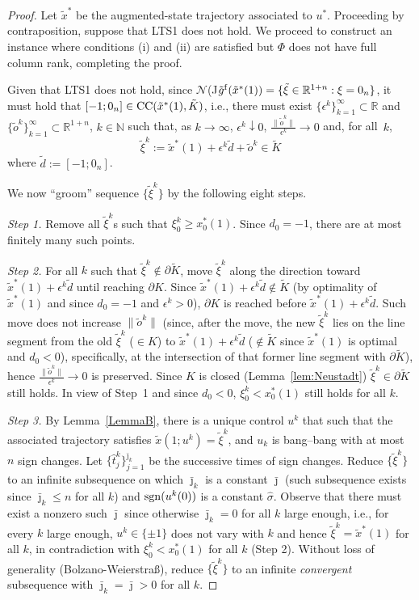 \documentclass[letterpaper,10pt,conference]{ieeeconf}
\def\R{{\mathbb{R}}}
\def\N{{\mathbb{N}}}
\begin{document}
\begin{proof}
Let $\tilde x^*$ be the augmented-state trajectory associated to $u^*$.
Proceeding by contraposition, suppose that LTS1 does not hold. 
We proceed to construct an instance where conditions (i) and (ii) are
satisfied but $\Phi$ does not have full column rank, completing the proof.

Given that LTS1 does not hold, since 
${\mathcal N}$(J$\tilde g^{\rm f}(\tilde x^*(1))
=\{\tilde\xi\in\R^{1+n}:\xi=0_n\}$, 
it must hold that $[-1;0_n]\in{\rm CC}(\tilde x^*(1),\tilde K)$, i.e.,
there must exist $\{\epsilon^k\}_{k=1}^\infty\subset\R$ and 
$\{\tilde o^k\}_{k=1}^\infty\subset\R^{1+n}$, $k\in \N$ such that, 
as $k\to\infty$,
$\epsilon^k\downarrow0$, %
$\frac{\|\tilde o^k\|}{\epsilon^k}\to0$ and, for all~$k$,
\[
\tilde\xi^k:=\tilde x^*(1) + \epsilon^k\tilde d + \tilde o^k\in\tilde K
\]
where 
$\tilde d:=[-1;0_n]$.

We now ``groom'' sequence $\{\tilde\xi^k\}$ by the following eight steps.

\smallskip\noindent
{\em Step 1.}
Remove all $\tilde\xi^k$s such that $\xi_0^k\geq x_0^*(1)$.  Since $d_0=-1$,
there are at most finitely many such points.

\smallskip\noindent
{\em Step 2.}
For all $k$ such that $\tilde\xi^k\not\in\partial\tilde K$, move $\tilde\xi^k$
along the direction toward $\tilde x^*(1)+\epsilon^k\tilde d$ until reaching 
$\partial K$.  Since $\tilde x^*(1)+\epsilon^k\tilde d\not\in\tilde K$ (by 
optimality of $\tilde x^*(1)$ and since $d_0=-1$ and $\epsilon^k>0$), 
$\partial K$ is reached before 
$\tilde x^*(1)+\epsilon^k\tilde d$.  Such move does not increase 
$\|\tilde o^k\|$ (since, after the move, the new $\tilde\xi^k$
lies on the line segment from the old $\tilde\xi^k$ ($\in K$)
to $\tilde x^*(1)+\epsilon^k\tilde d$ ($\not\in\tilde K$ since $\tilde x^*(1)$ 
is optimal and $d_0<0$), specifically, at the intersection
of that former line segment with $\partial\tilde K$), hence 
$\frac{\|\tilde o^k\|}{\epsilon^k}\to0$ is preserved.  
Since $K$ is closed (Lemma~\ref{lem:Neustadt}) 
$\tilde\xi^k\in\partial\tilde K$ still holds.  
In view of Step~1 and since $d_0<0$, $\xi_0^k<x_0^*(1)$ still holds for all $k$.

\smallskip\noindent
{\em Step 3.}
By Lemma~\ref{LemmaB}, there is a unique 
control $u^k$ that such that the associated
trajectory satisfies $\tilde x(1;u^k)=\tilde\xi^k$, and $u_k$ is bang--bang with
at most $n$ sign changes.  Let 
$\{\hat t_j^k\}_{j=1}^{\bar\jmath_k}$ be the successive
times of sign changes.  Reduce $\{\tilde\xi^k\}$ to an infinite subsequence
on which $\bar\jmath_k$ is a constant $\bar\jmath$ (such subsequence exists
since $\bar\jmath_k\leq n$ for all $k$) and ${\rm sgn}(u^k(0))$ is a constant
$\hat\sigma$.  Observe that there must exist a nonzero such $\bar\jmath$
since otherwise $\bar\jmath_k=0$ for all $k$ large enough, i.e., for every $k$
large enough, $u^k\in\{\pm1\}$ does not vary with $k$ and hence
$\tilde\xi^k=\tilde x^*(1)$ for all $k$,
in contradiction with 
$\xi_0^k<x_0^*(1)$ for all $k$ (Step 2).  Without loss of generality
(Bolzano-Weierstra{\ss}),
reduce $\{\tilde\xi^k\}$ to an infinite {\em convergent} subsequence
with $\bar\jmath_k=\bar\jmath>0$ for all $k$.


\end{proof}
\end{document}
